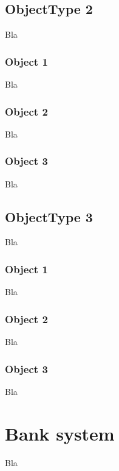 \documentclass[a4paper,12pt]{book}
\begin{document}
\subsection{ObjectType 2}
Bla
\subsubsection{Object 1}
Bla
\subsubsection{Object 2}
Bla
\subsubsection{Object 3}
Bla
\subsection{ObjectType 3}
Bla
\subsubsection{Object 1}
Bla
\subsubsection{Object 2}
Bla
\subsubsection{Object 3}
Bla
\section{Bank system}
Bla
\end{document}

